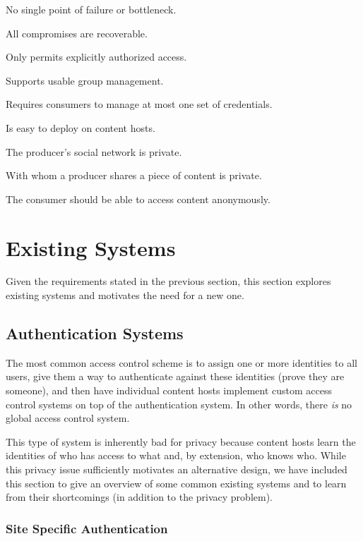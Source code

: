 \documentclass[pdftex,12pt,a4papaer,twoside,notitlepage]{report}
\begin{document}
\begin{compactenum}
\item No single point of failure or bottleneck.
\item All compromises are recoverable.
\item Only permits explicitly authorized access.
  \vspace{1em}
\item Supports usable group management.
\item Requires consumers to manage at most one set of credentials.
\item Is easy to deploy on content hosts.
  \vspace{1em}
\item The producer's social network is private.
\item With whom a producer shares a piece of content is private.
\item The consumer should be able to access content anonymously.
\end{compactenum}

\section{Existing Systems} 

Given the requirements stated in the previous section, this section explores existing
systems and motivates the need for a new one.

\subsection{Authentication Systems}

The most common access control scheme is to assign one or more identities to all
users, give them a way to authenticate against these identities (prove they are
someone), and then have individual content hosts implement custom access control
systems on top of the authentication system. In other words, there \emph{is} no
global access control system.

This type of system is inherently bad for privacy because content hosts learn
the identities of who has access to what and, by extension, who knows who. While
this privacy issue sufficiently motivates an alternative design, we have
included this section to give an overview of some common existing systems and to
learn from their shortcomings (in addition to the privacy problem).

\subsubsection{Site Specific Authentication}
\end{document}
